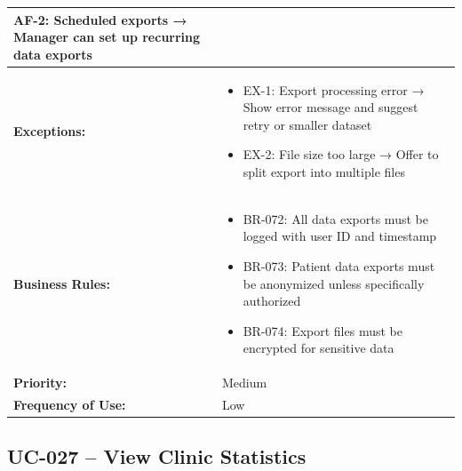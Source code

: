 \documentclass[12pt,a4paper]{article}
\begin{document}
\begin{longtable}{|p{4.5cm}|p{10.5cm}|}
\textbf{AF-2:} Scheduled exports → Manager can set up recurring data exports \\
\hline
\textbf{Exceptions:} &
\begin{itemize}
  \item EX-1: Export processing error → Show error message and suggest retry or smaller dataset
  \item EX-2: File size too large → Offer to split export into multiple files
\end{itemize} \\
\hline
\textbf{Business Rules:} &
\begin{itemize}
  \item BR-072: All data exports must be logged with user ID and timestamp
  \item BR-073: Patient data exports must be anonymized unless specifically authorized
  \item BR-074: Export files must be encrypted for sensitive data
\end{itemize} \\
\hline
\textbf{Priority:} & Medium \\
\hline
\textbf{Frequency of Use:} & Low \\
\hline
\end{longtable}

\subsection{UC-027 – View Clinic Statistics}
\end{document}
